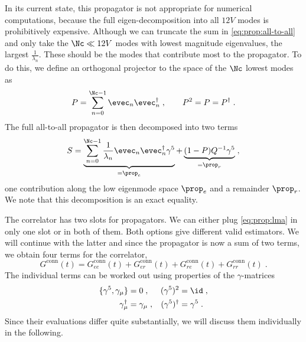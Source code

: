 In its current state, this propagator is not appropriate for numerical computations, because the full eigen-decomposition into all $12V$ modes is prohibitively expensive.
Although we can truncate the sum in \cref{eq:prop:all-to-all} and only take the $\Nc \ll 12 V$ modes with lowest magnitude eigenvalues, \ie the largest $\frac{1}{\lambda_{n}}$.
These should be the modes that contribute most to the propagator.
To do this, we define an orthogonal projector to the space of the $\Nc$ lowest modes as
\begin{equation} \label{eq:lma:projector}
P = \sum_{n=0}^{\Nc-1} \evec_n \evec_n^{\dagger} \;,
\qquad
P^{2} = P = P^{\dagger} \;.
\end{equation}
The full all-to-all propagator is then decomposed into two terms
\begin{equation} \label{eq:prop:lma}
S
= \underbrace{\sum_{n=0}^{\Nc-1}
  \frac{1}{\lambda_{n}} \evec_{n} \evec_{n}^{\dagger} \gamma^{5}}_{=\prop_e}
+ \underbrace{(1-P) Q^{-1} \gamma^{5}}_{=\prop_r} \;,
\end{equation}
one contribution along the low eigenmode space $\prop_e$ and a remainder $\prop_r$.
We note that this decomposition is an exact equality.

The correlator has two slots for propagators.
We can either plug \cref{eq:prop:lma} in only one slot or in both of them.
Both options give different valid estimators.
We will continue with the latter and since the propagator is now a sum of two terms, we obtain four terms for the correlator,
\begin{equation}
G^{\text{conn}}(t)
= G_{ee}^{\text{conn}}(t)
+ G_{er}^{\text{conn}}(t)
+ G_{re}^{\text{conn}}(t)
+ G_{rr}^{\text{conn}}(t) \;.
\end{equation}
The individual terms can be worked out using properties of the $\gamma$-matrices
\begin{align}
\{\gamma^{5}, \gamma_{\mu}\} &= 0 \;,        &  (\gamma^{5})^{2} &= \id \;, \\
\gamma_{\mu}^{\dagger} &= \gamma_{\mu} \;,   &  (\gamma^{5})^{\dagger} &= \gamma^{5} \;.
\end{align}
Since their evaluations differ quite substantially, we will discuss them individually in the following.

